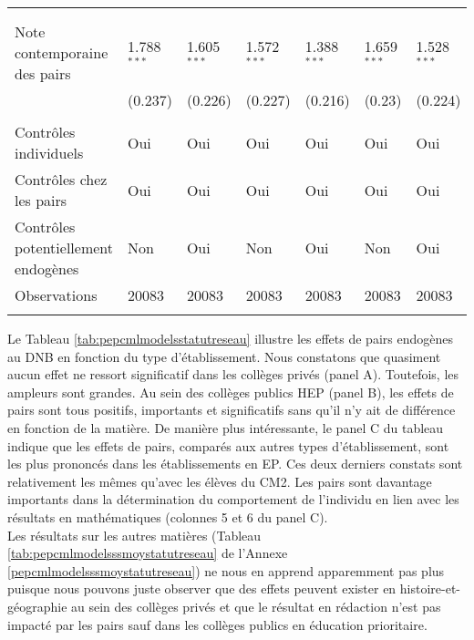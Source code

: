 \documentclass[
]{book}
\begin{document}
\begin{landscape}
\begin{ThreePartTable}
\begin{longtable}[t]{lllllll}
 &  &  &  &  &  \vphantom{2} & \\
\addlinespace[0.3em]
\multicolumn{7}{l}{\textbf{Panel C : Écoles publiques EP}}\\
\hline
\hspace{1em}Note contemporaine des pairs & 1.788$^{***}$ & 1.605$^{***}$ & 1.572$^{***}$ & 1.388$^{***}$ & 1.659$^{***}$ & 1.528$^{***}$\\
\hspace{1em} & (0.237) & (0.226) & (0.227) & (0.216) & (0.23) & (0.224)\\
\hspace{1em} &  &  &  &  &  \vphantom{1} & \\
\hspace{1em}Contrôles individuels & Oui & Oui & Oui & Oui & Oui & Oui\\
\hspace{1em}Contrôles chez les pairs & Oui & Oui & Oui & Oui & Oui & Oui\\
\hspace{1em}Contrôles potentiellement endogènes & Non & Oui & Non & Oui & Non & Oui\\
\hspace{1em}Observations & 20083 & 20083 & 20083 & 20083 & 20083 & 20083\\
 &  &  &  &  &  & \\*
\end{longtable}
\end{ThreePartTable}
\endgroup{}
\end{landscape}

Le Tableau \ref{tab:pepcmlmodelsstatutreseau} illustre les effets de pairs endogènes au DNB en fonction du type d'établissement. Nous constatons que quasiment aucun effet ne ressort significatif dans les collèges privés (panel A). Toutefois, les ampleurs sont grandes. Au sein des collèges publics HEP (panel B), les effets de pairs sont tous positifs, importants et significatifs sans qu'il n'y ait de différence en fonction de la matière. De manière plus intéressante, le panel C du tableau indique que les effets de pairs, comparés aux autres types d'établissement, sont les plus prononcés dans les établissements en EP. Ces deux derniers constats sont relativement les mêmes qu'avec les élèves du CM2. Les pairs sont davantage importants dans la détermination du comportement de l'individu en lien avec les résultats en mathématiques (colonnes 5 et 6 du panel C).\\
Les résultats sur les autres matières (Tableau \ref{tab:pepcmlmodelsssmoystatutreseau} de l'Annexe \ref{pepcmlmodelsssmoystatutreseau}) ne nous en apprend apparemment pas plus puisque nous pouvons juste observer que des effets peuvent exister en histoire-et-géographie au sein des collèges privés et que le résultat en rédaction n'est pas impacté par les pairs sauf dans les collèges publics en éducation prioritaire.
\end{document}
